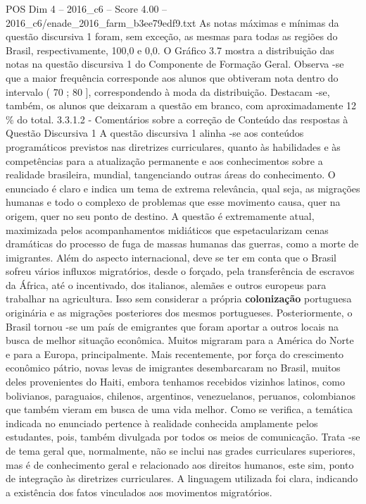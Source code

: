 \begin{textsample}{POS Dim 4 – 2016\_c6 – Score 4.00 – 2016\_c6/enade\_2016\_farm\_b3ee79edf9.txt}
As notas máximas e mínimas da questão discursiva 1 foram, sem exceção, as mesmas para todas as regiões do Brasil, respectivamente, 100,0 e 0,0.
O Gráfico 3.7 mostra a distribuição das notas na questão discursiva 1 do Componente de Formação Geral.
Observa -se que a maior frequência corresponde aos alunos que obtiveram nota dentro do intervalo ( 70 ; 80 ], correspondendo à moda da distribuição.
Destacam -se, também, os alunos que deixaram a questão em branco, com aproximadamente 12 \% do total. 3.3.1.2 - Comentários sobre a correção de Conteúdo das respostas à Questão Discursiva 1 A questão discursiva 1 alinha -se aos conteúdos programáticos previstos nas diretrizes curriculares, quanto às habilidades e às competências para a atualização permanente e aos conhecimentos sobre a realidade brasileira, mundial, tangenciando outras áreas do conhecimento.
O enunciado é claro e indica um tema de extrema relevância, qual seja, as migrações humanas e todo o complexo de problemas que esse movimento causa, quer na origem, quer no seu ponto de destino.
A questão é extremamente atual, maximizada pelos acompanhamentos midiáticos que espetacularizam cenas dramáticas do processo de fuga de massas humanas das guerras, como a morte de imigrantes.
Além do aspecto internacional, deve se ter em conta que o Brasil sofreu vários influxos migratórios, desde o forçado, pela transferência de escravos da África, até o incentivado, dos italianos, alemães e outros europeus para trabalhar na agricultura.
Isso sem considerar a própria \textbf{colonização} portuguesa originária e as migrações posteriores dos mesmos portugueses.
Posteriormente, o Brasil tornou -se um país de emigrantes que foram aportar a outros locais na busca de melhor situação econômica.
Muitos migraram para a América do Norte e para a Europa, principalmente.
Mais recentemente, por força do crescimento econômico pátrio, novas levas de imigrantes desembarcaram no Brasil, muitos deles provenientes do Haiti, embora tenhamos recebidos vizinhos latinos, como bolivianos, paraguaios, chilenos, argentinos, venezuelanos, peruanos, colombianos que também vieram em busca de uma vida melhor.
Como se verifica, a temática indicada no enunciado pertence à realidade conhecida amplamente pelos estudantes, pois, também divulgada por todos os meios de comunicação.
Trata -se de tema geral que, normalmente, não se inclui nas grades curriculares superiores, mas é de conhecimento geral e relacionado aos direitos humanos, este sim, ponto de integração às diretrizes curriculares.
A linguagem utilizada foi clara, indicando a existência dos fatos vinculados aos movimentos migratórios.

\end{textsample}
